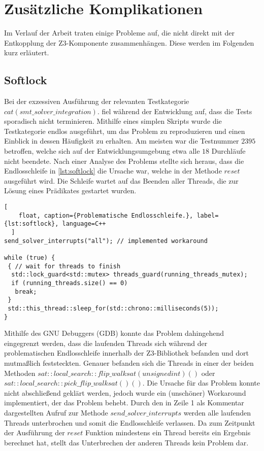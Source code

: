 
\section{Zusätzliche Komplikationen}

Im Verlauf der Arbeit traten einige Probleme auf, die nicht direkt mit der Entkopplung der Z3-Komponente zusammenhängen. Diese werden im Folgenden kurz erläutert.

\subsection{Softlock}
\label{subsec:softlock}

Bei der exzessiven Ausführung der relevanten Testkategorie $cat(smt\_solver\_integration).$ fiel während der Entwicklung auf,
dass die Tests sporadisch nicht terminieren.
Mithilfe eines simplen Skripts wurde die Testkategorie endlos ausgeführt, um das Problem zu reproduzieren und einen Einblick in dessen Häufigkeit zu erhalten.
Am meisten war die Testnummer $2395$ betroffen, welche sich auf der Entwicklungsumgebung etwa alle $18$ Durchläufe nicht beendete. 
Nach einer Analyse des Problems stellte sich heraus, dass die Endlosschleife in \cref{lst:softlock} die Ursache war, welche in der Methode $reset$ ausgeführt wird.
Die Schleife wartet auf das Beenden aller Threads, die zur Lösung eines Prädikates gestartet wurden.

\begin{lstlisting}[
    float, caption={Problematische Endlosschleife.}, label={lst:softlock}, language=C++
  ]
send_solver_interrupts("all"); // implemented workaround

while (true) {
 { // wait for threads to finish
  std::lock_guard<std::mutex> threads_guard(running_threads_mutex);
  if (running_threads.size() == 0)
   break;
 }
 std::this_thread::sleep_for(std::chrono::milliseconds(5));
}
\end{lstlisting}

Mithilfe des GNU Debuggers (GDB) \cite{stallman1988debugging} konnte das Problem dahingehend eingegrenzt werden,
dass die laufenden Threads sich während der problematischen Endlosschleife innerhalb der Z3-Bibliothek befanden
und dort mutmaßlich feststeckten.
Genauer befanden sich die Threads in einer der beiden Methoden $sat::local\_search::flip\_walksat(unsigned int) ()$ oder $sat::local\_search::pick\_flip\_walksat() ()$.
Die Ursache für das Problem konnte nicht abschließend geklärt werden, jedoch wurde ein (unschöner) Workaround implementiert, der das Problem behebt.
Durch den in Zeile 1 als Kommentar dargestellten Aufruf zur Methode $send\_solver\_interrupts$ werden alle laufenden Threads unterbrochen und somit die Endlosschleife verlassen.
Da zum Zeitpunkt der Ausführung der $reset$ Funktion mindestens ein Thread bereits ein Ergebnis berechnet hat, stellt das Unterbrechen der anderen Threads kein Problem dar.

